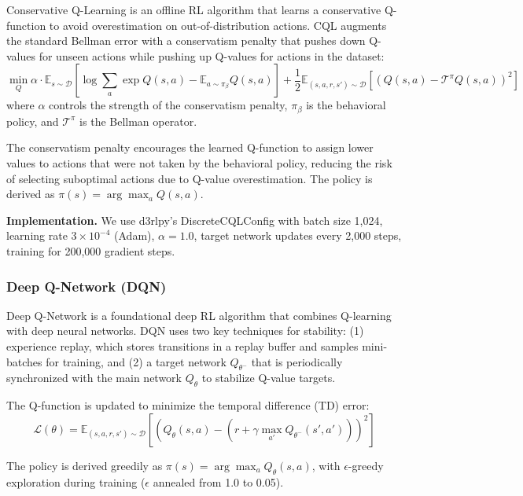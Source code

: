 Conservative Q-Learning \citep{kumar2020cql} is an offline RL algorithm that learns a conservative Q-function to avoid overestimation on out-of-distribution actions. CQL augments the standard Bellman error with a conservatism penalty that pushes down Q-values for unseen actions while pushing up Q-values for actions in the dataset:
\begin{equation}
\min_Q \alpha \cdot \mathbb{E}_{s \sim \mathcal{D}} \left[ \log \sum_a \exp Q(s, a) - \mathbb{E}_{a \sim \pi_\beta} Q(s, a) \right] + \frac{1}{2} \mathbb{E}_{(s,a,r,s') \sim \mathcal{D}} \left[ (Q(s,a) - \mathcal{T}^\pi Q(s,a))^2 \right]
\end{equation}
where $\alpha$ controls the strength of the conservatism penalty, $\pi_\beta$ is the behavioral policy, and $\mathcal{T}^\pi$ is the Bellman operator.

The conservatism penalty encourages the learned Q-function to assign lower values to actions that were not taken by the behavioral policy, reducing the risk of selecting suboptimal actions due to Q-value overestimation. The policy is derived as $\pi(s) = \arg\max_a Q(s, a)$.

\textbf{Implementation.} We use d3rlpy's DiscreteCQLConfig with batch size 1,024, learning rate $3 \times 10^{-4}$ (Adam), $\alpha = 1.0$, target network updates every 2,000 steps, training for 200,000 gradient steps.

\subsubsection{Deep Q-Network (DQN)}

Deep Q-Network \citep{mnih2015dqn} is a foundational deep RL algorithm that combines Q-learning with deep neural networks. DQN uses two key techniques for stability: (1) experience replay, which stores transitions in a replay buffer and samples mini-batches for training, and (2) a target network $Q_{\theta^-}$ that is periodically synchronized with the main network $Q_\theta$ to stabilize Q-value targets.

The Q-function is updated to minimize the temporal difference (TD) error:
\begin{equation}
\mathcal{L}(\theta) = \mathbb{E}_{(s,a,r,s') \sim \mathcal{D}} \left[ \left( Q_\theta(s,a) - \left( r + \gamma \max_{a'} Q_{\theta^-}(s', a') \right) \right)^2 \right]
\end{equation}

The policy is derived greedily as $\pi(s) = \arg\max_a Q_\theta(s, a)$, with $\epsilon$-greedy exploration during training ($\epsilon$ annealed from 1.0 to 0.05).

